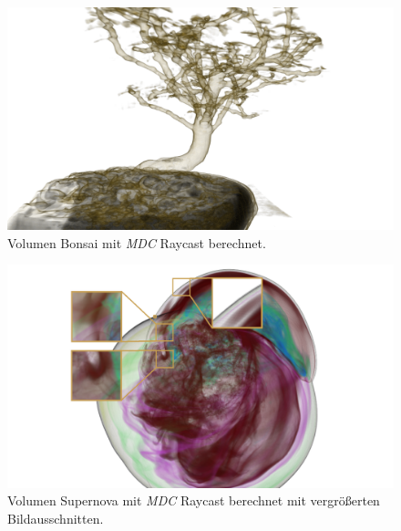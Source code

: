 \begin{landscape}
	\begin{figure}
		\centering
		\includegraphics[width=1\textheight]{../../Grafiken/results/picture_quality/bonsai/MDC_img-0-96_ray-1-5.png}
		\caption{Volumen Bonsai mit \emph{MDC} Raycast berechnet.}
		\label{fig::res::bon_mdc}
	\end{figure}
\end{landscape}

\begin{landscape}
	\begin{figure}
		\centering
		\includegraphics[width=\textheight]{../../Grafiken/results/picture_quality/supernova/MDC_img-0-96_ray-1-5_edited.png}
		\caption{Volumen Supernova mit \emph{MDC} Raycast berechnet mit vergrößerten Bildausschnitten.}
		\label{fig::res::sup_mdc}
	\end{figure}
\end{landscape}

